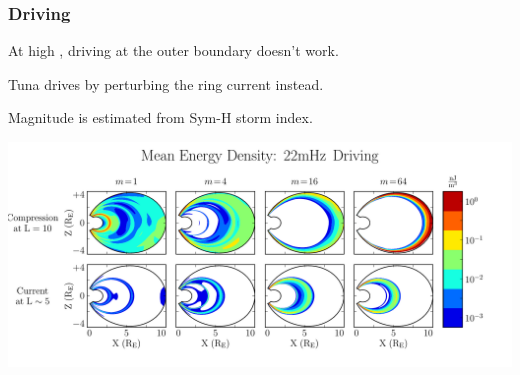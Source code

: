 \documentclass{beamer}
\begin{document}
\begin{frame}
\frametitle{Driving}

\begin{wideitemize}
\item At high \azm, driving at the outer boundary doesn't work. 
\item Tuna drives by perturbing the ring current instead. 
\item Magnitude is estimated from Sym-H storm index. 
\end{wideitemize}

\vfill

\includegraphics[width=\textwidth]{figures/drivers.pdf}%

\end{frame}

\end{document}
